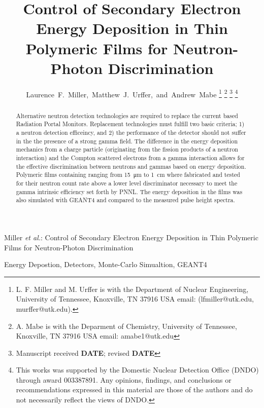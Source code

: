 \documentclass[draftcls,onecolumn]{IEEEtran}
\newcommand{\papertitle}{Control of Secondary Electron Energy Deposition in Thin Polymeric Films for Neutron-Photon Discrimination}
\begin{document}
\title{\papertitle}
\author{Laurence~F.~Miller,~Matthew~J.~Urffer,~and~Andrew~Mabe%
	\thanks{L. F. Miller and M. Urffer is with the Department of Nuclear Engineering, University of Tennessee, Knoxville, TN 37916 USA email: (lfmiller@utk.edu, murffer@utk.edu).}%
	\thanks{A. Mabe is with the Deparment of Chemistry, University of Tennessee, Knoxville, TN 37916 USA email: amabe1@utk.edu}%
	\thanks{Manuscript received \textbf{DATE}; revised \textbf{DATE}}%
	\thanks{This works was supported by the Domestic Nuclear Detection Office (DNDO) through award 003387891.
Any opinions, findings, and conclusions or recommendations expressed in this material are those of the authors and do not necessarily reflect the views of DNDO.}}

%
{Miller \MakeLowercase{\textit{et al.}}: \papertitle}

\maketitle
\begin{abstract}
Alternative neutron detection technologies are required to replace the current  based Radiation Portal Monitors.
Replacement technologies must fulfill two basic criteria; 1) a neutron detection efficeincy, and 2) the performance of the detector should not suffer in the the presence of a strong gamma field.
The difference in the energy deposition mechanics from a charge particle (originating from the fission products of a neutron interaction) and the Compton scattered electrons from a gamma interaction allows for the effective discrimination between neutrons and gammas based on energy deposition.
Polymeric films containing  ranging from \SI{15}{\um} to \SI{1}{\cm} where fabricated and tested for their neutron count rate above a lower level discriminator necessary to meet the gamma intrinsic efficiency set forth by PNNL.
The energy deposition in the films was also simulated with GEANT4 and compared to the measured pulse height spectra.
\end{abstract}

\begin{IEEEkeywords}
Energy Depostion, Detectors, Monte-Carlo Simualtion, GEANT4
\end{IEEEkeywords}

\IEEEpeerreviewmaketitle

\end{document}

